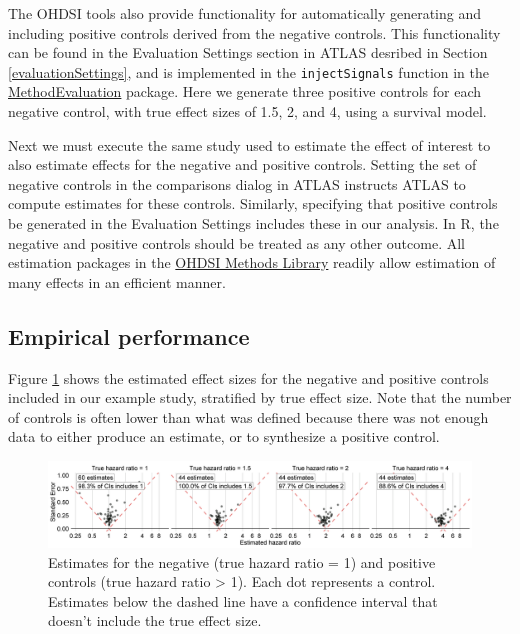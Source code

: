 \documentclass[11pt]{book}
\begin{document}
The OHDSI tools also provide functionality for automatically generating
and including positive controls derived from the negative controls. This
functionality can be found in the Evaluation Settings section in ATLAS
desribed in Section \ref{evaluationSettings}, and is implemented in the
\texttt{injectSignals} function in the
\href{https://ohdsi.github.io/MethodEvaluation/}{MethodEvaluation}
package. Here we generate three positive controls for each negative
control, with true effect sizes of 1.5, 2, and 4, using a survival
model.

Next we must execute the same study used to estimate the effect of
interest to also estimate effects for the negative and positive
controls. Setting the set of negative controls in the comparisons dialog
in ATLAS instructs ATLAS to compute estimates for these controls.
Similarly, specifying that positive controls be generated in the
Evaluation Settings includes these in our analysis. In R, the negative
and positive controls should be treated as any other outcome. All
estimation packages in the
\href{https://ohdsi.github.io/MethodsLibrary/}{OHDSI Methods Library}
readily allow estimation of many effects in an efficient manner.

\subsection{Empirical performance}\label{empirical-performance}

Figure \ref{fig:controls} shows the estimated effect sizes for the
negative and positive controls included in our example study, stratified
by true effect size. Note that the number of controls is often lower
than what was defined because there was not enough data to either
produce an estimate, or to synthesize a positive control.

\begin{figure}

{\centering \includegraphics[width=1\linewidth]{images/MethodValidity/controls} 

}

\caption{Estimates for the negative (true hazard ratio = 1) and positive controls (true hazard ratio > 1). Each dot represents a control. Estimates below the dashed line have a confidence interval that doesn't include the true effect size.}\label{fig:controls}
\end{figure}
\end{document}
